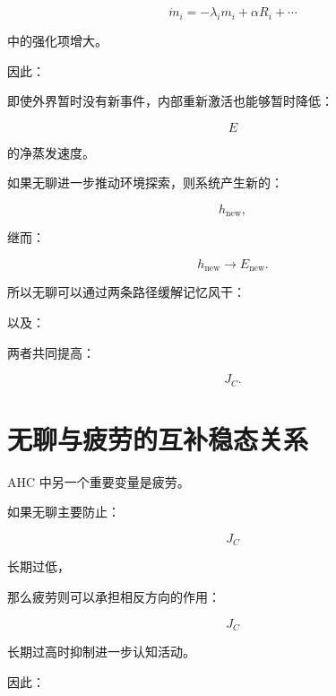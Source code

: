 \[
\dot m_i
=
-\lambda_i m_i
+
\alpha R_i+\cdots
\]

中的强化项增大。

因此：

\begin{statementbox}
\centering
{}
\end{statementbox}

即使外界暂时没有新事件，内部重新激活也能够暂时降低：

\[
E
\]

的净蒸发速度。

如果无聊进一步推动环境探索，则系统产生新的：

\[
h_{\mathrm{new}},
\]

继而：

\[
h_{\mathrm{new}}
\rightarrow
E_{\mathrm{new}}.
\]

所以无聊可以通过两条路径缓解记忆风干：

\begin{statementbox}
\centering
{}
\end{statementbox}

以及：

\begin{statementbox}
\centering
{}
\end{statementbox}

两者共同提高：

\[
J_C.
\]

\section{无聊与疲劳的互补稳态关系}

AHC 中另一个重要变量是疲劳。

如果无聊主要防止：

\[
J_C
\]

长期过低，

那么疲劳则可以承担相反方向的作用：

\[
J_C
\]

长期过高时抑制进一步认知活动。

因此：

\begin{statementbox}
\centering
{}
\end{statementbox}

